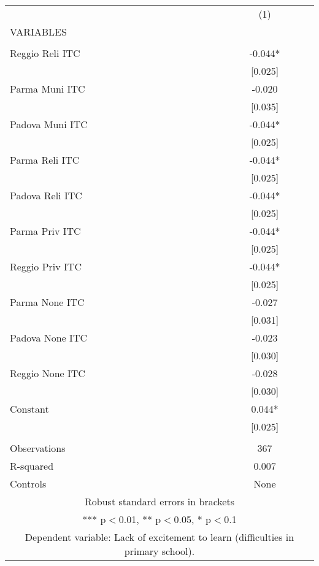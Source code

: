 \begin{tabular}{lc} \hline
 & (1) \\
VARIABLES &  \\ \hline
 &  \\
Reggio Reli ITC & -0.044* \\
 & [0.025] \\
Parma Muni ITC & -0.020 \\
 & [0.035] \\
Padova Muni ITC & -0.044* \\
 & [0.025] \\
Parma Reli ITC & -0.044* \\
 & [0.025] \\
Padova Reli ITC & -0.044* \\
 & [0.025] \\
Parma Priv ITC & -0.044* \\
 & [0.025] \\
Reggio Priv ITC & -0.044* \\
 & [0.025] \\
Parma None ITC & -0.027 \\
 & [0.031] \\
Padova None ITC & -0.023 \\
 & [0.030] \\
Reggio None ITC & -0.028 \\
 & [0.030] \\
Constant & 0.044* \\
 & [0.025] \\
 &  \\
Observations & 367 \\
R-squared & 0.007 \\
 Controls & None \\ \hline
\multicolumn{2}{c}{ Robust standard errors in brackets} \\
\multicolumn{2}{c}{ *** p$<$0.01, ** p$<$0.05, * p$<$0.1} \\
\multicolumn{2}{c}{ Dependent variable: Lack of excitement to learn (difficulties in primary school).} \\
\end{tabular}

